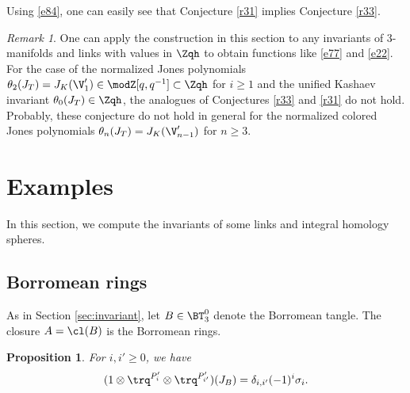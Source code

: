 \documentclass{amsart}
\numberwithin{equation}{section}
\numberwithin{figure}{section}
\theoremstyle{plain}
\newtheorem{proposition}[theorem]{Proposition}
\theoremstyle{definition}
\theoremstyle{remark}
\newtheorem{remark}[theorem]{Remark}
\begin{document}
Using \eqref{e84}, one can easily see that Conjecture \ref{r31}
implies Conjecture \ref{r33}.

\begin{remark}
  \label{r65}
  One can apply the construction in this section to any invariants of
  $3$-manifolds and links with values in $\Zqh$ to obtain functions
  like \eqref{e77} and \eqref{e22}.  For the case of the normalized
  Jones polynomials $\theta _2(J_T) = J_K(\V'_1)\in \modZ [q,q^{-1}]\subset \Zqh$ for
  $i\ge 1$ and the unified Kashaev invariant $\theta _0(J_T)\in \Zqh$, the
  analogues of Conjectures \ref{r33} and \ref{r31} do not hold.
  Probably, these conjecture do not hold in general for the normalized
  colored Jones polynomials $\theta _n(J_T) = J_K(\V'_{n-1})$ for $n\ge 3$.
\end{remark}

\section{Examples}
\label{sec14}

In this section, we compute the invariants of some links and integral
homology spheres.

\subsection{Borromean rings}
\label{sec:borromean-rings}

As in Section \ref{sec:invariant}, let $B\in \BT^0_3$ denote the
Borromean tangle.  The closure $A=\cl(B)$ is the Borromean rings.

\begin{proposition}
  \label{r4}
  For $i,i'\ge 0$, we have
  \begin{equation*}
    (1\otimes \trq^{P'_{i}}\otimes \trq^{P'_{i'}})(J_B) =\delta _{i,i'}(-1)^i\sigma _i .
  \end{equation*}
\end{proposition}
\end{document}
